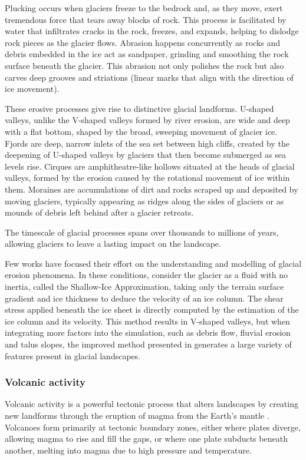 Plucking occurs when glaciers freeze to the bedrock and, as they move, exert tremendous force that tears away blocks of rock. This process is facilitated by water that infiltrates cracks in the rock, freezes, and expands, helping to dislodge rock pieces as the glacier flows. Abrasion happens concurrently as rocks and debris embedded in the ice act as sandpaper, grinding and smoothing the rock surface beneath the glacier. This abrasion not only polishes the rock but also carves deep grooves and striations (linear marks that align with the direction of ice movement).

These erosive processes give rise to distinctive glacial landforms. U-shaped valleys, unlike the V-shaped valleys formed by river erosion, are wide and deep with a flat bottom, shaped by the broad, sweeping movement of glacier ice. Fjords are deep, narrow inlets of the sea set between high cliffs, created by the deepening of U-shaped valleys by glaciers that then become submerged as sea levels rise. Cirques are amphitheatre-like hollows situated at the heads of glacial valleys, formed by the erosion caused by the rotational movement of ice within them. Moraines are accumulations of dirt and rocks scraped up and deposited by moving glaciers, typically appearing as ridges along the sides of glaciers or as mounds of debris left behind after a glacier retreats.

The timescale of glacial processes spans over thousands to millions of years, allowing glaciers to leave a lasting impact on the landscape.

Few works have focused their effort on the understanding and modelling of glacial erosion phenomena. In these conditions, \cite{Argudo2020} consider the glacier as a fluid with no inertia, called the Shallow-Ice Approximation, taking only the terrain surface gradient and ice thickness to deduce the velocity of an ice column. The shear stress applied beneath the ice sheet is directly computed by the estimation of the ice column and its velocity. This method results in V-shaped valleys, but when integrating more factors into the simulation, such as debris flow, fluvial erosion and talus slopes, the improved method presented in \cite{Cordonnier2023} generates a large variety of features present in glacial landscapes.

\subsubsection{Volcanic activity}
Volcanic activity is a powerful tectonic process that alters landscapes by creating new landforms through the eruption of magma from the Earth's mantle \cite{Ramalho2013}. Volcanoes form primarily at tectonic boundary zones, either where plates diverge, allowing magma to rise and fill the gaps, or where one plate subducts beneath another, melting into magma due to high pressure and temperature.

